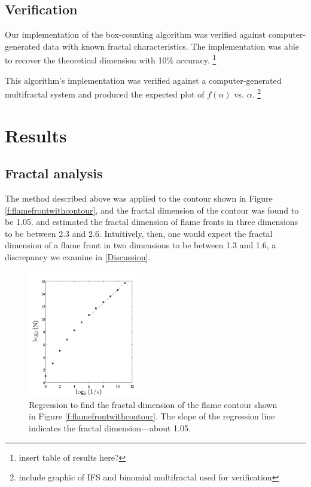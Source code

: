 \documentclass[iop]{emulateapj}
\begin{document}
\subsection{Verification}\label{Verification}

Our implementation of the box-counting algorithm was verified against computer-generated data with known fractal characteristics. The implementation was able to recover the theoretical dimension with 10\% accuracy. \footnote{insert table of results here?}

This algorithm’s implementation was verified against a computer-generated multifractal system and produced the expected plot of $f(\alpha)$ vs. $\alpha$. \footnote{include graphic of IFS and binomial multifractal used for verification}

\section{Results}\label{Results}

\subsection{Fractal analysis}\label{FractalResults}
The method described above was applied to the contour shown in Figure \ref{f:flamefrontwithcontour}, and the fractal dimension of the contour was found to be 1.05. \cite{Timmes1994} and \cite{Blinnikov1996} estimated the fractal dimension of flame fronts in three dimensions to be between 2.3 and 2.6. Intuitively, then, one would expect the fractal dimension of a flame front in two dimensions to be between 1.3 and 1.6, a discrepancy we examine in \textsection \ref{Discussion}.

\begin{figure}
	\begin{center}
	\includegraphics[width=0.45\textwidth,clip=true]{Graphics/logNvsE.png}
	\caption{Regression to find the fractal dimension of the flame contour shown in Figure \ref{f:flamefrontwithcontour}. The slope of the regression line indicates the fractal dimension—about 1.05.
	\label{f:logNvsE}}
	\end{center}
	\end{figure} 
\end{document}

